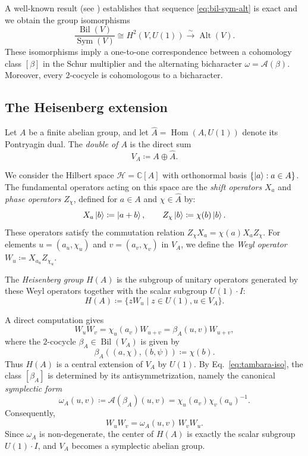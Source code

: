 \documentclass[11pt, reqno]{amsart}
\theoremstyle{definition}
\theoremstyle{remark}
\newcommand{\C}{\mathbb{C}}
\newcommand{\HH}{\mathcal{H}}
\DeclareMathOperator{\Alt}{Alt}
\DeclareMathOperator{\Hom}{Hom}
\DeclareMathOperator{\Sym}{Sym}
\DeclareMathOperator{\Bil}{Bil}
\begin{document}
A well-known result (see \cite[Proposition 2.1]{Tambara2000}) establishes that sequence \eqref{eq:bil-sym-alt} is exact and we obtain the group isomorphisms
\begin{equation}\label{eq:tambara-iso}
\frac{\Bil(V)}{\Sym(V)} \cong H^2(V, U(1)) \xrightarrow{\sim} \Alt(V).
\end{equation}
These isomorphisms imply a one-to-one correspondence between a cohomology class $[\beta]$ in the Schur multiplier and the alternating bicharacter $\omega = \mathcal{A}(\beta)$. Moreover, every $2$-cocycle is cohomologous to a bicharacter.


\subsection{The Heisenberg extension}

Let $A$ be a finite abelian group, and let $\widehat{A} = \Hom(A, U(1))$ denote its Pontryagin dual. The \emph{double of $A$} is the direct sum
\[
V_A \coloneqq A \oplus \widehat{A}.
\]

We consider the Hilbert space $\HH = \C[A]$ with orthonormal basis $\{\ket{a} : a \in A\}$. The fundamental operators acting on this space are the \emph{shift operators} $X_a$ and \emph{phase operators} $Z_\chi$, defined for $a \in A$ and $\chi \in \widehat{A}$ by:
\begin{equation}
X_a \ket{b} \coloneqq \ket{a+b}, \qquad Z_\chi \ket{b} \coloneqq \chi(b)\ket{b}.
\end{equation}
These operators satisfy the commutation relation $Z_\chi X_a = \chi(a) X_a Z_\chi$.
For elements $u = (a_u, \chi_u)$ and $v = (a_v, \chi_v)$ in $V_A$, we define the \emph{Weyl operator} $W_u \coloneqq X_{a_u} Z_{\chi_u}$.

The \emph{Heisenberg group} $H(A)$ is the subgroup of unitary operators generated by these Weyl operators together with the scalar subgroup $U(1)\cdot I$:
\begin{equation}
H(A) \coloneqq \{ z W_u \mid z \in U(1), u \in V_A \}.
\end{equation}

A direct computation gives
\begin{equation}
W_u W_v = \chi_u(a_v) W_{u+v} = \beta_A(u,v) W_{u+v},
\end{equation}
where the $2$-cocycle $\beta_A \in \Bil(V_A)$ is given by
\begin{equation}
\beta_A((a, \chi), (b, \psi)) \coloneqq \chi(b).
\end{equation}
Thus $H(A)$ is a central extension of $V_A$ by $U(1)$. By Eq.~\eqref{eq:tambara-iso}, the class $[\beta_A]$ is determined by its antisymmetrization, namely the canonical \emph{symplectic form}
\begin{equation}
\omega_A(u, v) \coloneqq \mathcal{A}(\beta_A)(u, v) = \chi_u(a_v)\chi_v(a_u)^{-1}.
\end{equation}
Consequently,
\[
W_uW_v=\omega_A(u,v)\,W_vW_u.
\]
Since $\omega_A$ is non-degenerate, the center of $H(A)$ is exactly the scalar subgroup $U(1)\cdot I$, and $V_A$ becomes a symplectic abelian group.
\end{document}
